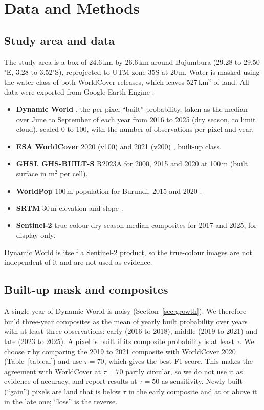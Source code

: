 \documentclass[conference]{IEEEtran}
\begin{document}
\section{Data and Methods}

\subsection{Study area and data}
The study area is a box of 24.6\,km by 26.6\,km around Bujumbura (29.28 to 29.50$^\circ$E, 3.28 to 3.52$^\circ$S), reprojected to UTM zone 35S at 20\,m. Water is masked using the water class of both WorldCover releases, which leaves 527\,km$^2$ of land. All data were exported from Google Earth Engine \cite{gorelick2017gee}:
\begin{itemize}
\item \textbf{Dynamic World} \cite{brown2022dw}, the per-pixel ``built'' probability, taken as the median over June to September of each year from 2016 to 2025 (dry season, to limit cloud), scaled 0 to 100, with the number of observations per pixel and year.
\item \textbf{ESA WorldCover} 2020 (v100) and 2021 (v200) \cite{zanaga2021wc,zanaga2022wc}, built-up class.
\item \textbf{GHSL GHS-BUILT-S} R2023A \cite{pesaresi2023ghsl} for 2000, 2015 and 2020 at 100\,m (built surface in m$^2$ per cell).
\item \textbf{WorldPop} 100\,m population for Burundi, 2015 and 2020 \cite{tatem2017worldpop}.
\item \textbf{SRTM} 30\,m elevation and slope \cite{farr2007srtm}.
\item \textbf{Sentinel-2} \cite{drusch2012s2} true-colour dry-season median composites for 2017 and 2025, for display only.
\end{itemize}
Dynamic World is itself a Sentinel-2 product, so the true-colour images are not independent of it and are not used as evidence.

\subsection{Built-up mask and composites}
A single year of Dynamic World is noisy (Section~\ref{sec:growth}). We therefore build three-year composites as the mean of yearly built probability over years with at least three observations: early (2016 to 2018), middle (2019 to 2021) and late (2023 to 2025). A pixel is built if its composite probability is at least $\tau$. We choose $\tau$ by comparing the 2019 to 2021 composite with WorldCover 2020 (Table~\ref{tab:cal}) and use $\tau=70$, which gives the best F1 score. This makes the agreement with WorldCover at $\tau=70$ partly circular, so we do not use it as evidence of accuracy, and report results at $\tau=50$ as sensitivity. Newly built (``gain'') pixels are land that is below $\tau$ in the early composite and at or above it in the late one; ``loss'' is the reverse.
\end{document}

